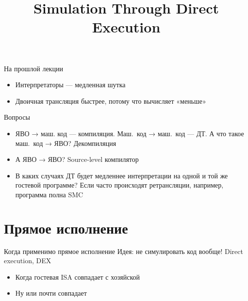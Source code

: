 
\title{Simulation Through Direct Execution}



\begin{frame}
    \maketitle
\end{frame}

\begin{frame}
    \tableofcontents
\end{frame}


\begin{frame}{На прошлой лекции}
\begin{itemize}
\item Интерпретаторы — медленная шутка
\item Двоичная трансляция быстрее, потому что вычисляет «меньше»
\end{itemize}
\end{frame}

\begin{frame}{Вопросы}
\begin{itemize}
\item ЯВО → маш. код — компиляция. Маш.~код → маш.~код — ДТ. А что такое маш.~код → ЯВО?\pause{} Декомпиляция\pause
\item А ЯВО → ЯВО?\pause{} Source-level компилятор\pause
\item В каких случаях ДТ будет медленнее интерпретации на одной и той же гостевой программе? \pause Если часто происходят ретрансляции, например, программа полна SMC
\end{itemize}

\end{frame}


\section{Прямое исполнение}

\begin{frame}{Когда применимо прямое исполнение}
Идея: не симулировать код вообще! Direct execution, DEX
\begin{itemize}
\item Когда гостевая ISA совпадает с хозяйской
\item Ну или почти совпадает
\end{itemize}

\end{frame}

